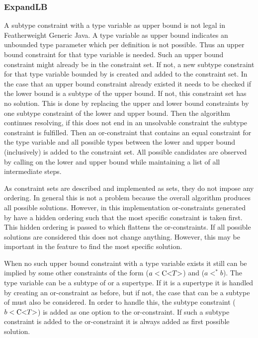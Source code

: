 \subsubsection{ExpandLB}
A subtype constraint with a type variable as upper bound is not legal in Featherweight Generic Java. A type variable as upper bound indicates an unbounded type parameter which per definition is not possible.
Thus an upper bound constraint for that type variable is needed. Such an upper bound constraint might already be in the constraint set. If not, a new subtype constraint for that type variable bounded by  is created and added to the constraint set.
In the case that an upper bound constraint already existed it needs to be checked if the lower bound is a subtype of the upper bound. If not, this constraint set has no solution. This is done by replacing the upper and lower bound constraints by one subtype constraint of the lower and upper bound. Then the algorithm continues resolving, if this does not end in an unsolvable constraint the subtype constraint is fulfilled.
Then an or-constraint that contains an equal constraint for the type variable and all possible types between the lower and upper bound (inclusively) is added to the constraint set. All possible candidates are observed by calling  on the lower and upper bound while maintaining a list of all intermediate steps.

As constraint sets are described and implemented as sets, they do not impose any ordering. In general this is not a problem because the overall algorithm produces all possible solutions. However, in this implementation or-constraints generated by  have a hidden ordering such that the most specific constraint is taken first.
This hidden ordering is passed to  which flattens the or-constraints. If all possible solutions are considered this does not change anything.
However, this may be important in the feature to find the most specific solution.

When no such upper bound constraint with a type variable exists it still can be implied by some other constraints of the form ($a < \text{C} \text{<} T \text{>}$) and ($a <^* b$). The type variable can be a subtype of  or a supertype. If it is a supertype it is handled by creating an or-constraint as before, but if not, the case that  can be a subtype of  must also be considered. In order to handle this,
the subtype constraint ($b < \text{C} \text{<} T \text{>}$) is added as one option to the or-constraint. If such a subtype constraint is added to the or-constraint it is always added as first possible solution.

